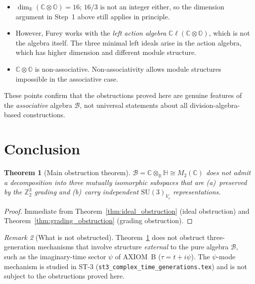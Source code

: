 \documentclass[12pt,a4paper]{article}
\newtheorem{theorem}{Theorem}[section]
\theoremstyle{remark}
\newtheorem{remark}[theorem]{Remark}
\begin{document}
\begin{itemize}
  \item $\dim_\mathbb{R}(\mathbb{C}\otimes\mathbb{O}) = 16$;
    $16 / 3$ is not an integer either, so the dimension argument in
    Step~1 above still applies in principle.
  \item However, Furey works with the \emph{left action algebra}
    $\mathbb{C}\ell(\mathbb{C}\otimes\mathbb{O})$, which is not the algebra
    itself.  The three minimal left ideals arise in the action algebra, which
    has higher dimension and different module structure.
  \item $\mathbb{C}\otimes\mathbb{O}$ is non-associative.  Non-associativity
    allows module structures impossible in the associative case.
\end{itemize}

These points confirm that the obstructions proved here are genuine features of
the \emph{associative} algebra $\mathcal{B}$, not universal statements about
all division-algebra-based constructions.

\section{Conclusion}
\label{sec:conclusion}

\begin{theorem}[Main obstruction theorem]
  \label{thm:main}
  $\mathcal{B} = \mathbb{C}\otimes_\mathbb{R}\mathbb{H} \cong M_2(\mathbb{C})$
  does not admit a decomposition into three mutually isomorphic subspaces
  that are (a)~preserved by the $\mathbb{Z}_2^3$ grading and (b)~carry
  independent $\mathrm{SU}(3)_{V_c}$ representations.
\end{theorem}

\begin{proof}
  Immediate from Theorem~\ref{thm:ideal_obstruction} (ideal obstruction)
  and Theorem~\ref{thm:grading_obstruction} (grading obstruction).
\end{proof}

\begin{remark}[What is not obstructed]
  Theorem~\ref{thm:main} does not obstruct three-generation mechanisms that
  involve structure \emph{external} to the pure algebra $\mathcal{B}$,
  such as the imaginary-time sector $\psi$ of AXIOM~B
  ($\tau = t + i\psi$).  The $\psi$-mode mechanism is studied in
  ST-3 (\texttt{st3\_complex\_time\_generations.tex}) and is not
  subject to the obstructions proved here.
\end{remark}
\end{document}
